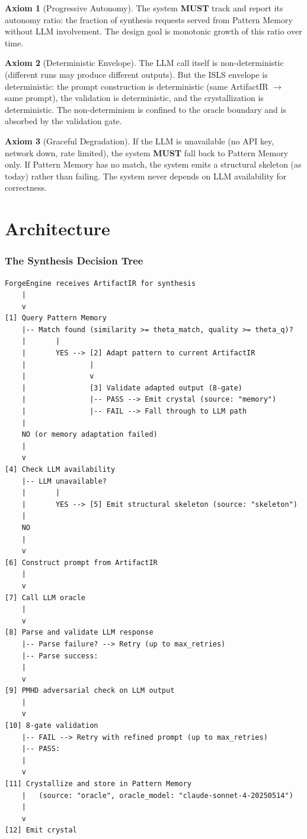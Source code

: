 \documentclass[11pt,a4paper,twoside]{article}
\theoremstyle{definition}
\newtheorem{axiom}{Axiom}[section]
\theoremstyle{plain}
\theoremstyle{remark}
\newcommand{\ISLS}{\textsf{ISLS}}
\begin{document}
\begin{axiom}[Progressive Autonomy]\label{ax:autonomy}
The system \textbf{MUST} track and report its autonomy ratio: the
fraction of synthesis requests served from Pattern Memory without LLM
involvement. The design goal is monotonic growth of this ratio over
time.
\end{axiom}

\begin{axiom}[Deterministic Envelope]\label{ax:envelope}
The LLM call itself is non-deterministic (different runs may produce
different outputs). But the \ISLS{} envelope is deterministic: the
prompt construction is deterministic (same ArtifactIR $\to$ same
prompt), the validation is deterministic, and the crystallization is
deterministic. The non-determinism is confined to the oracle boundary
and is absorbed by the validation gate.
\end{axiom}

\begin{axiom}[Graceful Degradation]\label{ax:degrade}
If the LLM is unavailable (no API key, network down, rate limited),
the system \textbf{MUST} fall back to Pattern Memory only. If Pattern
Memory has no match, the system emits a structural skeleton (as
today) rather than failing. The system never depends on LLM
availability for correctness.
\end{axiom}


\part{Architecture}\label{part:arch}

\section{The Synthesis Decision Tree}\label{sec:tree}

\begin{lstlisting}[title={Synthesis Decision Flow}]
ForgeEngine receives ArtifactIR for synthesis
    |
    v
[1] Query Pattern Memory
    |-- Match found (similarity >= theta_match, quality >= theta_q)?
    |       |
    |       YES --> [2] Adapt pattern to current ArtifactIR
    |               |
    |               v
    |               [3] Validate adapted output (8-gate)
    |               |-- PASS --> Emit crystal (source: "memory")
    |               |-- FAIL --> Fall through to LLM path
    |
    NO (or memory adaptation failed)
    |
    v
[4] Check LLM availability
    |-- LLM unavailable?
    |       |
    |       YES --> [5] Emit structural skeleton (source: "skeleton")
    |
    NO
    |
    v
[6] Construct prompt from ArtifactIR
    |
    v
[7] Call LLM oracle
    |
    v
[8] Parse and validate LLM response
    |-- Parse failure? --> Retry (up to max_retries)
    |-- Parse success:
    |
    v
[9] PMHD adversarial check on LLM output
    |
    v
[10] 8-gate validation
    |-- FAIL --> Retry with refined prompt (up to max_retries)
    |-- PASS:
    |
    v
[11] Crystallize and store in Pattern Memory
    |   (source: "oracle", oracle_model: "claude-sonnet-4-20250514")
    |
    v
[12] Emit crystal
\end{lstlisting}
\end{document}
